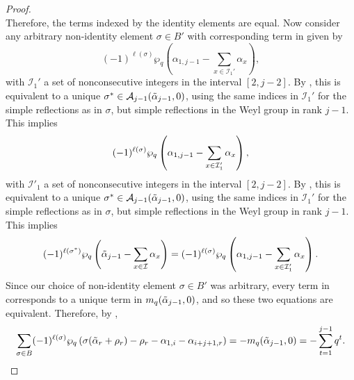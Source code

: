 \documentclass[10pt]{article}
\newcommand{\hr}[0]{\Tilde{\alpha}}
\newcommand{\qpartition}[1]{\wp_q\left(#1\right)}
\begin{document}
\begin{proof}
\begin{equation}
    \end{equation}
    Therefore, the terms indexed by the identity elements are equal. Now consider any arbitrary non-identity element $\sigma\in B'$ with corresponding term in  given by
    \begin{equation*}
        (-1)^{\ell(\sigma)}\qpartition{\alpha_{1,j-1}-\sum_{x\in\mathcal{I}_1'}\alpha_x},
    \end{equation*}
    with $\mathcal{I}_1'$ a set of nonconsecutive integers in the interval $[2,j-2]$. By , this is equivalent to a unique $\sigma^*\in\mathcal{A}_{j-1}(\hr_{j-1},0)$, using the same indices in $\mathcal{I}_1'$ for the simple reflections as in $\sigma$, but simple reflections in the Weyl group in rank $j-1$. This implies
    \begin{equation}
        (-1)^{\ell(\sigma)}\qpartition{\alpha_{1,j-1}-\sum_{x\in\mathcal{I}'_1}\alpha_x},\notag
    \end{equation}
    with $\mathcal{I}'_1$  a set of nonconsecutive integers in the interval $[2,j-2]$. By , this is equivalent to a unique $\sigma^*\in\mathcal{A}_{j-1}(\hr_{j-1},0)$, using the same indices in $\mathcal{I}_1'$ for the simple reflections as in $\sigma$, but simple reflections in the Weyl group in rank $j-1$. This implies 
    \begin{equation}
        (-1)^{\ell(\sigma^*)}\qpartition{\hr_{j-1}-\sum_{x\in\mathcal{I}}\alpha_x}=(-1)^{\ell(\sigma)}\qpartition{\alpha_{1,j-1}-\sum_{x\in\mathcal{I}_1'}\alpha_x}.\notag
    \end{equation}
    Since our choice of non-identity element $\sigma\in B'$ was arbitrary, every term in  corresponds to a unique term in $m_q(\hr_{j-1},0)$, and so these two equations are equivalent. Therefore, by , 
    \begin{equation}
        \sum_{\sigma\in B} (-1)^{\ell(\sigma)}\qpartition{\sigma(\hr_r+\rho_r)-\rho_r-\alpha_{1,i}-\alpha_{i+j+1,r}}= - m_q(\hr_{j-1},0) = - \sum_{t=1}^{j-1}q^t.\label{DIFF OF EQS SUM 2}
    \end{equation}
    

\end{proof}
\end{document}
